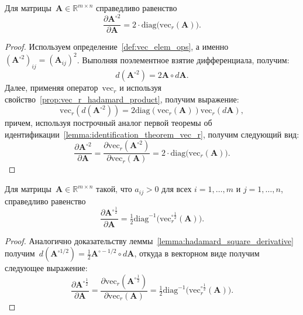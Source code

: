 \begin{lemma}\label{lemma:hadamard_square_derivative}
    Для матрицы~$\mathbf{A} \in \mathbb{R}^{m \times n}$ справедливо равенство
    \begin{equation}
        \frac{\partial \mathbf{A}^{\circ 2}}{\partial \mathbf{A}}
        = 2 \cdot \mathrm{diag}\!\big(\mathrm{vec}_r(\mathbf{A})\big).
    \end{equation}
\end{lemma}
\begin{proof}
    Используем определение~\ref{def:vec_elem_ops}, а именно $(\mathbf{A}^{\circ 2})_{ij} = (\mathbf{A}_{ij})^2$.
    Выполняя поэлементное взятие дифференциала, получим:
    \begin{equation}
        d(\mathbf{A}^{\circ 2}) = 2\mathbf{A} \circ d\mathbf{A}.
    \end{equation}
    Далее, применяя оператор~$\mathrm{vec}_r$ и используя свойство~\ref{prop:vec_r_hadamard_product}, получим выражение:
    \begin{equation}
        \mathrm{vec}_r(d(\mathbf{A}^{\circ 2})) = 2 \mathrm{diag}(\mathrm{vec}_r(\mathbf{A})) \mathrm{vec}_r (d\mathbf{A}),
    \end{equation}
    причем, используя построчный аналог первой теоремы об идентификации~\ref{lemma:identification_theorem_vec_r}, получим следующий вид:
    \begin{equation}
        \frac{\partial \mathbf{A}^{\circ 2}}{\partial \mathbf{A}}
        = \frac{\partial \mathrm{vec}_r(\mathbf{A}^{\circ 2})}{\partial \mathrm{vec}_r(\mathbf{A})} = 2 \cdot \mathrm{diag}\!\big(\mathrm{vec}_r(\mathbf{A})\big).
    \end{equation}
\end{proof}

\begin{lemma}\label{lemma:hadamard_root_derivative}
    Для матрицы~$\mathbf{A} \in \mathbb{R}^{m \times n}$ такой, что $a_{ij} > 0$ для всех $i = 1, \ldots, m$ и $j = 1, \ldots, n$, справедливо равенство
    \begin{equation}
        \frac{\partial \mathbf{A}^{\circ \frac{1}{2}}}{\partial \mathbf{A}}
        = \tfrac{1}{2} \mathrm{diag}^{-1}\!\big(\mathrm{vec}_r^{\circ \frac{1}{2}}(\mathbf{A})\big).
    \end{equation}
\end{lemma}
\begin{proof}
    Аналогично доказательству леммы~\ref{lemma:hadamard_square_derivative} получим~$d(\mathbf{A}^{\circ 1/2}) = \frac{1}{2}\mathbf{A}^{\circ -1/2} \circ d\mathbf{A}$, откуда в векторном виде получим следующее выражение:
    \begin{equation}
        \frac{\partial \mathbf{A}^{\circ \frac{1}{2}}}{\partial \mathbf{A}}
        = \frac{\partial \mathrm{vec}_r(\mathbf{A}^{\circ \frac{1}{2}})}{\partial \mathrm{vec}_r(\mathbf{A})} = \tfrac{1}{2} \mathrm{diag}^{-1}\!\big(\mathrm{vec}_r^{\circ \frac{1}{2}}(\mathbf{A})\big).
    \end{equation}
\end{proof}

